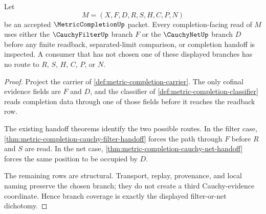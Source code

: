 \begin{theorem}
\label{thm:metric-completion-branch-coverage}
Let
$$
M=(X,F,D,R,S,H,C,P,N)
$$
be an accepted $\MetricCompletionUp$ packet. Every completion-facing read of $M$ uses either the $\CauchyFilterUp$ branch $F$ or the $\CauchyNetUp$ branch $D$ before any finite readback, separated-limit comparison, or completion handoff is inspected. A consumer that has not chosen one of these displayed branches has no route to $R$, $S$, $H$, $C$, $P$, or $N$.
\end{theorem}
\begin{proof}
Project the carrier of \autoref{def:metric-completion-carrier}. The only cofinal evidence fields are $F$ and $D$, and the classifier of \autoref{def:metric-completion-classifier} reads completion data through one of those fields before it reaches the readback row.

The existing handoff theorems identify the two possible routes. In the filter case, \autoref{thm:metric-completion-cauchy-filter-handoff} forces the path through $F$ before $R$ and $S$ are read. In the net case, \autoref{thm:metric-completion-cauchy-net-handoff} forces the same position to be occupied by $D$.

The remaining rows are structural. Transport, replay, provenance, and local naming preserve the chosen branch; they do not create a third Cauchy-evidence coordinate. Hence branch coverage is exactly the displayed filter-or-net dichotomy.
\end{proof}

